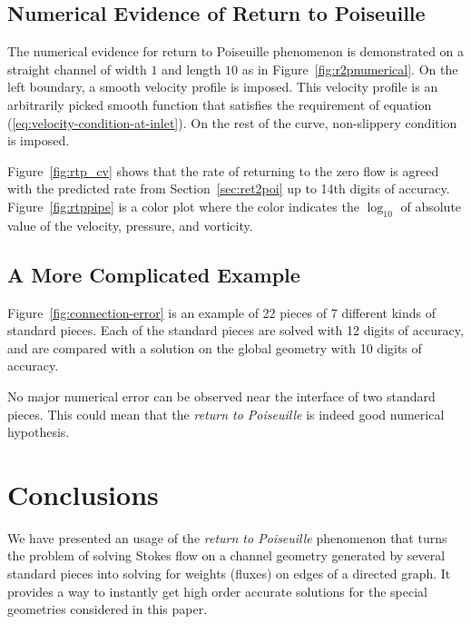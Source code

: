 \documentclass[10pt,twocolumn,letterpaper]{article}
\begin{document}
\subsection{Numerical Evidence of Return to Poiseuille}
The numerical evidence for return to Poiseuille phenomenon is 
demonstrated on a straight channel of width $1$ 
and length $10$ as in Figure~\ref{fig:r2pnumerical}.
On the left boundary, a smooth velocity profile is imposed. 
This velocity profile is an arbitrarily picked smooth function 
that satisfies the requirement of equation (\ref{eq:velocity-condition-at-inlet}). 
On the rest of the curve, non-slippery condition is imposed.

Figure~\ref{fig:rtp_cv} shows that the rate of 
returning to the zero flow is agreed with the predicted rate 
from Section~\ref{sec:ret2poi} up to 14th digits of accuracy. 
Figure~\ref{fig:rtppipe} is a color plot where the color indicates
the $\log_{10}$ of absolute value of the velocity, pressure, and vorticity. 

\subsection{A More Complicated Example}
Figure~\ref{fig:connection-error} is an example of 22 pieces of
7 different kinds of standard pieces. 
Each of the standard pieces are solved with 12 digits of accuracy,
and are compared with a solution on the global geometry with 10 digits of accuracy. 

No major numerical error can be observed near the interface of two standard pieces. 
This could mean that the \textit{return to Poiseuille} is indeed good numerical hypothesis. 



\section{Conclusions\label{sec:conclusions}}

We have presented an usage of the \textit{return to Poiseuille} phenomenon
that turns the problem of solving Stokes flow on a channel geometry generated by 
several standard pieces into solving for weights (fluxes) on edges of a directed graph. 
It provides a way to instantly get high order accurate solutions for 
the special geometries considered in this paper. 
\end{document}
